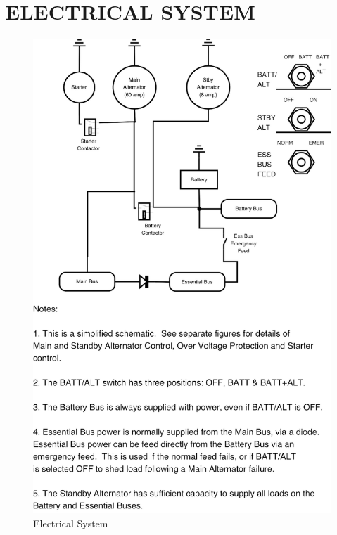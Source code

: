 \section{ELECTRICAL SYSTEM}
\begin{figure}
\includegraphics[clip,scale=0.4]{../Diagrams/Electrical_system_large_note_gc} \caption{Electrical System}
\end{figure}

